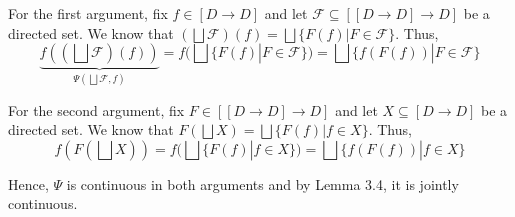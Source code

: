 For the first argument, fix $f \in [D \to D]$ and let $\mathcal{F} \subseteq [[D \to D] \to D]$ be a directed set.
We know that $(\bigsqcup \mathcal{F})(f) = \bigsqcup \{ F(f) | F \in \mathcal{F} \}$.
Thus, $$  \underbrace{f((\bigsqcup \mathcal{F})(f))}_{\Psi (\bigsqcup \mathcal{F} ,f)} = f(\bigsqcup \{ F(f) | F \in \mathcal{F} \}) = \bigsqcup \{ f(F(f)) | F \in \mathcal{F} \}  $$

For the second argument, fix $F \in [[D \to D] \to D]$ and let $X \subseteq [D \to D]$ be a directed set. We know that $F(\bigsqcup X) = \bigsqcup \{ F(f) | f \in X \}$. Thus,
$$  f(F(\bigsqcup X)) = f(\bigsqcup \{F(f) | f \in X\}) = \bigsqcup \{f(F(f)) | f \in X \}  $$

Hence, $\Psi$ is continuous in both arguments and by Lemma 3.4, it is jointly continuous.